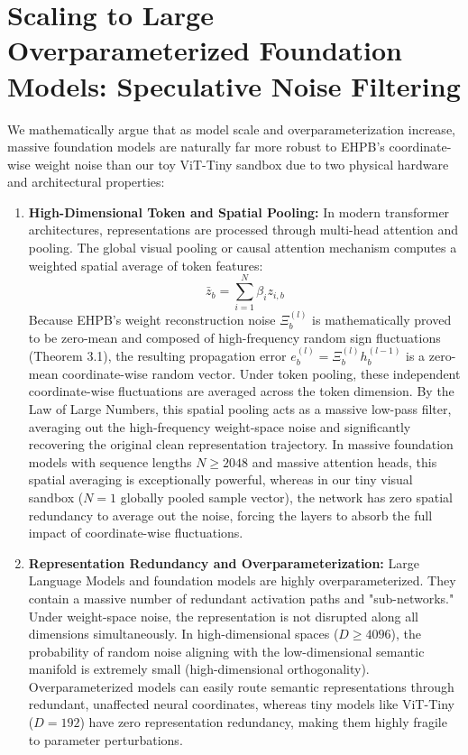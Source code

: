 \documentclass{article}
\theoremstyle{plain}
\theoremstyle{definition}
\theoremstyle{remark}
\begin{document}
\section{Scaling to Large Overparameterized Foundation Models: Speculative Noise Filtering}
\label{app:foundation_scaling}

We mathematically argue that as model scale and overparameterization increase, massive foundation models are naturally far more robust to EHPB's coordinate-wise weight noise than our toy ViT-Tiny sandbox due to two physical hardware and architectural properties:

\begin{enumerate}
\item \textbf{High-Dimensional Token and Spatial Pooling:}
In modern transformer architectures, representations are processed through multi-head attention and pooling. The global visual pooling or causal attention mechanism computes a weighted spatial average of token features:
\begin{equation}
\bar{z}_b = \sum_{i=1}^N \beta_i z_{i, b}
\end{equation}
Because EHPB's weight reconstruction noise $\Xi_b^{(l)}$ is mathematically proved to be zero-mean and composed of high-frequency random sign fluctuations (Theorem 3.1), the resulting propagation error $e_b^{(l)} = \Xi_b^{(l)} h_b^{(l-1)}$ is a zero-mean coordinate-wise random vector. Under token pooling, these independent coordinate-wise fluctuations are averaged across the token dimension. By the Law of Large Numbers, this spatial pooling acts as a massive low-pass filter, averaging out the high-frequency weight-space noise and significantly recovering the original clean representation trajectory. In massive foundation models with sequence lengths $N \geq 2048$ and massive attention heads, this spatial averaging is exceptionally powerful, whereas in our tiny visual sandbox ($N=1$ globally pooled sample vector), the network has zero spatial redundancy to average out the noise, forcing the layers to absorb the full impact of coordinate-wise fluctuations.
\item \textbf{Representation Redundancy and Overparameterization:}
Large Language Models and foundation models are highly overparameterized. They contain a massive number of redundant activation paths and "sub-networks." Under weight-space noise, the representation is not disrupted along all dimensions simultaneously. In high-dimensional spaces ($D \geq 4096$), the probability of random noise aligning with the low-dimensional semantic manifold is extremely small (high-dimensional orthogonality). Overparameterized models can easily route semantic representations through redundant, unaffected neural coordinates, whereas tiny models like ViT-Tiny ($D=192$) have zero representation redundancy, making them highly fragile to parameter perturbations.
\end{enumerate}
\end{document}
